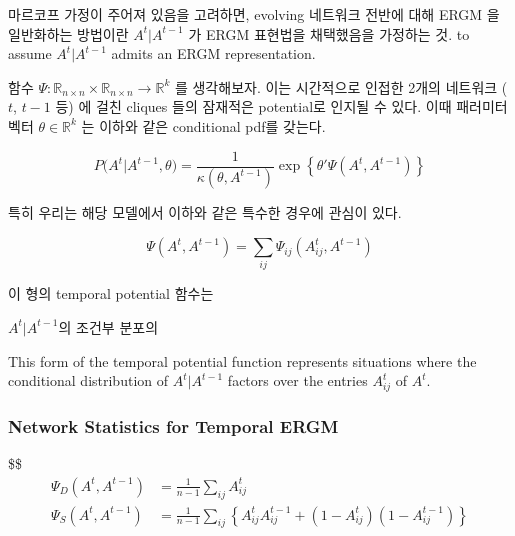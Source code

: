 \documentclass[
]{book}
\begin{document}
{{{마르코프 가정이 주어져 있음을 고려하면, evolving 네트워크 전반에 대해 ERGM 을 일반화하는 방법이란 \(A^t \vert A^{t-1}\) 가 ERGM 표현법을 채택했음을 가정하는 것. to assume \(A^t \vert A^{t-1}\) admits an ERGM representation.

함수 \(\Psi : \mathbb R_{n \times n} \times \mathbb R_{n \times n} \rightarrow \mathbb R^k\) 를 생각해보자. 이는 시간적으로 인접한 2개의 네트워크 (\(t\), \(t-1\) 등) 에 걸친 cliques 들의 잠재적은 potential로 인지될 수 있다. 이때 패러미터 벡터 \(\theta \in \mathbb R^k\) 는 이하와 같은 conditional pdf를 갖는다.

\[
P \bigg( A^t \Big | A^{t-1}, \theta \bigg) = \frac{1}{\kappa(\theta, A^{t-1})} \exp \left\{ \theta' \Psi \left ( A^t, A^{t-1} \right ) \right\}
\]

특히 우리는 해당 모델에서 이하와 같은 특수한 경우에 관심이 있다.

\[
\Psi \left ( A^t, A^{t-1} \right ) = \sum_{ij}\Psi_{ij} \left ( A^t_{ij}, A^{t-1} \right )
\]

이 형의 temporal potential 함수는

\(A^t | A^{t-1}\)의 조건부 분포의

This form of the temporal potential function represents situations where the conditional distribution of \(A^t | A^{t-1}\) factors over the entries \(A^t_{ij}\) of \(A^t\).

\hypertarget{network-statistics-for-temporal-ergm}{%
\subsubsection{Network Statistics for Temporal ERGM}\label{network-statistics-for-temporal-ergm}}

\$\$
\begin{align}
\Psi_D \left ( A^t , A^{t-1}\right)

&=

\frac{1}{n-1} \sum_{ij} A^t_{ij}

\tag{Density}

\\

\Psi_S \left ( A^t , A^{t-1}\right)

&=

\frac{1}{n-1} \sum_{ij}

\left \{ A^t_{ij} A^{t-1}_{ij} + \left (1-A^t_{ij} \right) \left (1-A^{t-1}_{ij} \right)
\right \}


\tag{Stability}

\\


\end{align}}}}
\end{document}
